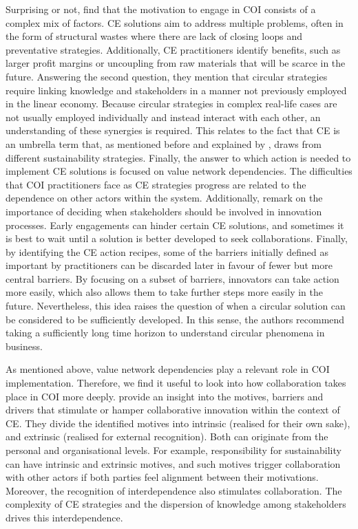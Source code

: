 Surprising or not, \citeauthor{blomsma2022making} find that the motivation to engage in COI consists of a complex mix of factors. CE solutions aim to address multiple problems, often in the form of structural wastes where there are lack of closing loops and preventative strategies. Additionally, CE practitioners identify benefits, such as larger profit margins or uncoupling from raw materials that will be scarce in the future. Answering the second question, they mention that circular strategies require linking knowledge and stakeholders in a manner not previously employed in the linear economy. Because circular strategies in complex real-life cases are not usually employed individually and instead interact with each other, an understanding of these synergies is required. This relates to the fact that CE is an umbrella term that, as mentioned before and explained by \cite{kalmykova2018circular}, draws from different sustainability strategies. Finally, the answer to which action is needed to implement CE solutions is focused on value network dependencies. The difficulties that COI practitioners face as CE strategies progress are related to the dependence on other actors within the system. Additionally, \cite{blomsma2022making} remark on the importance of deciding when stakeholders should be involved in innovation processes. Early engagements can hinder certain CE solutions, and sometimes it is best to wait until a solution is better developed to seek collaborations. Finally, by identifying the CE action recipes, some of the barriers initially defined as important by practitioners can be discarded later in favour of fewer but more central barriers. By focusing on a subset of barriers, innovators can take action more easily, which also allows them to take further steps more easily in the future. Nevertheless, this idea raises the question of when a circular solution can be considered to be sufficiently developed. In this sense, the authors recommend taking a sufficiently long time horizon to understand circular phenomena in business. 

As mentioned above, value network dependencies play a relevant role in COI implementation. Therefore, we find it useful to look into how collaboration takes place in COI more deeply. \cite{brown2019companies} provide an insight into the motives, barriers and drivers that stimulate or hamper collaborative innovation within the context of CE. They divide the identified motives into intrinsic (realised for their own sake), and extrinsic (realised for external recognition).
Both can originate from the personal and organisational levels. For example, responsibility for sustainability can have intrinsic and extrinsic motives, and such motives trigger collaboration with other actors if both parties feel alignment between their motivations. Moreover, the recognition of interdependence also stimulates collaboration. The complexity of CE strategies and the dispersion of knowledge among stakeholders drives this interdependence. 

